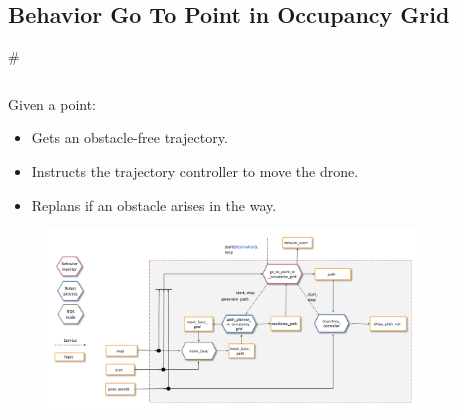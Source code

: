 \documentclass[]{beamer}
\def\mOrangeItem{\item[\textcolor{orange}{\textbullet}]}
\newcommand{\mSlideTitle}{{{\color{gray}\secname}} \# \subsecname}
\begin{document}
\subsection{Behavior Go To Point in Occupancy Grid}
\begin{frame}{\mSlideTitle}
  \begin{columns}
    \hspace{0.5cm}
    \begin{column}{0.55\textwidth}
      Given a point:
      \begin{itemize}
        \mOrangeItem Gets an obstacle-free trajectory.
        \mOrangeItem Instructs the trajectory controller to move the drone.
        \mOrangeItem Replans if an obstacle arises in the way.
      \end{itemize}
      \begin{minipage}{0.65\textheight}
        \begin{figure}[!ht]
          \hspace{-2cm}
          \vspace{-2cm}
          \centering
          \includegraphics[width=1.5\textwidth,keepaspectratio]{BehaviorGTPArquitecture.png}
        \end{figure}
      \end{minipage}
    \end{column}
    \hspace{2.0cm}
    \begin{column}{0.45\textwidth}
      \begin{figure}
        \centering

\end{figure}
\end{column}
\end{columns}
\end{frame}
\end{document}
